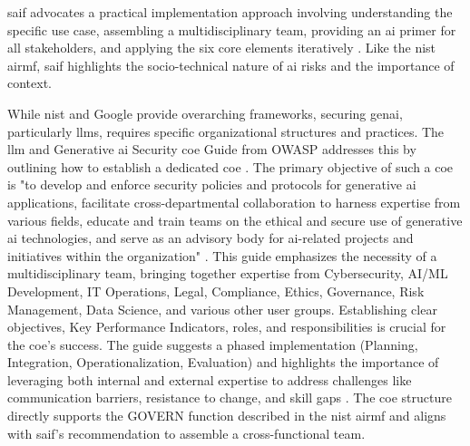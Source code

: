 \gls{saif} advocates a practical implementation approach involving understanding the specific use case, assembling a multidisciplinary team, providing an \gls{ai} primer for all stakeholders, and applying the six core elements iteratively \cite{hansen_introducing_2023}. Like the \gls{nist} \gls{airmf}, \gls{saif} highlights the socio-technical nature of \gls{ai} risks and the importance of context.

While \gls{nist} and Google provide overarching frameworks, securing \gls{genai}, particularly \glspl{llm}, requires specific organizational structures and practices. The \gls{llm} and Generative \gls{ai} Security \gls{coe} Guide from OWASP addresses this by outlining how to establish a dedicated \gls{coe} \cite{editor_llm_nodate-1}. The primary objective of such a \gls{coe} is "to develop and enforce security policies and protocols for generative \gls{ai} applications, facilitate cross-departmental collaboration to harness expertise from various fields, educate and train teams on the ethical and secure use of generative \gls{ai} technologies, and serve as an advisory body for \gls{ai}-related projects and initiatives within the organization" \cite[p.4]{editor_llm_nodate-1}. This guide emphasizes the necessity of a multidisciplinary team, bringing together expertise from Cybersecurity, AI/ML Development, IT Operations, Legal, Compliance, Ethics, Governance, Risk Management, Data Science, and various other user groups\cite{editor_llm_nodate-1}. Establishing clear objectives, Key Performance Indicators, roles, and responsibilities is crucial for the \gls{coe}'s success. The guide suggests a phased implementation (Planning, Integration, Operationalization, Evaluation) and highlights the importance of leveraging both internal and external expertise to address challenges like communication barriers, resistance to change, and skill gaps \cite{editor_llm_nodate-1}. The \gls{coe} structure directly supports the GOVERN function described in the \gls{nist} \gls{airmf} and aligns with \gls{saif}'s recommendation to assemble a cross-functional team.

